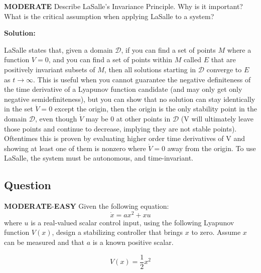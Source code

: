 \documentclass{article}
\newenvironment{Solution}{
\begin{tcolorbox}
\color{purple}
\textbf{Solution:}
}
{
\end{tcolorbox}
\ignorespacesafterend
}
\newcommand{\RatingBase}[2]{\textcolor{#1}{{\fontfamily{phv}\selectfont\textbf{#2}}}}
\newcommand{\Easy}{\RatingBase{green!50!black!50}{EASY}}
\newcommand{\Moderate}{\RatingBase{yellow!50!black!50}{MODERATE}}
\begin{document}
\Moderate{} Describe LaSalle's Invariance Principle.  Why is it important?  What is the critical assumption when applying LaSalle to a system?

\begin{Solution}
LaSalle states that, given a domain $\mathcal{D}$,  if you can find a set of points $M$ where a function $V=0$, and you can find a set of points within $M$ called $E$ that are positively invariant subsets of $M$, then all solutions starting in $\mathcal{D}$ converge to $E$ as $t\rightarrow \infty$.
\vskip 1mm
This is useful when you cannot guarantee the negative definiteness of the time derivative of a Lyapunov function candidate (and may only get only negative semidefiniteness), but you can show that no solution can stay identically in the set $\dot{V}=0$ except the origin, then the origin is the only stability point in the domain $\mathcal{D}$, even though $\dot{V}$ may be $0$ at other points in $\mathcal{D}$ (V will ultimately leave those points and continue to decrease, implying they are not stable points).  Oftentimes this is proven by evaluating higher order time derivatives of V and showing at least one of them is nonzero where $\dot{V}=0$ away from the origin.
\vskip 1mm
To use LaSalle, the system must be autonomous, and time-invariant.
\end{Solution}

\subsection{Question} \Moderate{}-\Easy{}
Given the following equation:
\begin{equation}
\dot{x}= a x^2 + x u
\end{equation}
where $u$ is a real-valued scalar control input, using the following Lyapunov function $V(x)$, design a stabilizing controller that brings $x$ to zero.  Assume $x$ can be measured and that $a$ is a known positive scalar.

\begin{equation}
V(x) = \frac{1}{2}x^2
\end{equation}
\end{document}
